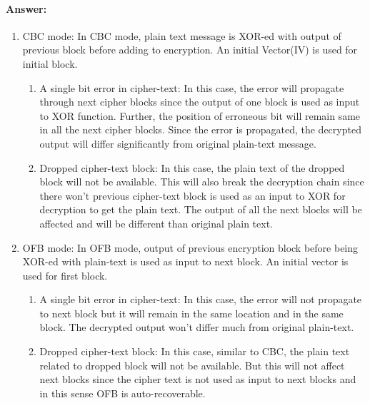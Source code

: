 \documentclass{article}
\begin{document}
    \paragraph{Answer: \newline}
    \begin{enumerate}
        \item CBC mode: In CBC mode, plain text message is XOR-ed with output of previous block before adding to encryption. An initial Vector(IV) is used for initial block. 
            \begin{enumerate}
                \item A single bit error in cipher-text: \newline
                In this case, the error will propagate through next cipher blocks since the output of one block is used as input to XOR function. Further, the position of erroneous bit will remain same in all the next cipher blocks. Since the error is propagated, the decrypted output will differ significantly from original plain-text message.
                \item Dropped cipher-text block:\newline
                In this case, the plain text of the dropped block will not be available. This will also break the decryption chain since there won't previous cipher-text block is used as an input to XOR for decryption to get the plain text. The output of all the next blocks will be affected and will be different than original plain text.
            \end{enumerate}
        \item OFB mode: In OFB mode, output of previous encryption block before being XOR-ed with plain-text is used as input to next block. An initial vector is used for first block.
            \begin{enumerate}
                \item A single bit error in cipher-text:\newline
                In this case, the error will not propagate to next block but it will remain in the same location and in the same block. The decrypted output won't differ much from original plain-text.
                \item Dropped cipher-text block: \newline
                In this case, similar to CBC, the plain text related to dropped block will not be available. But this will not affect next blocks since the cipher text is not used as input to next blocks and in this sense OFB is auto-recoverable.

\end{enumerate}
\end{enumerate}
\end{document}
